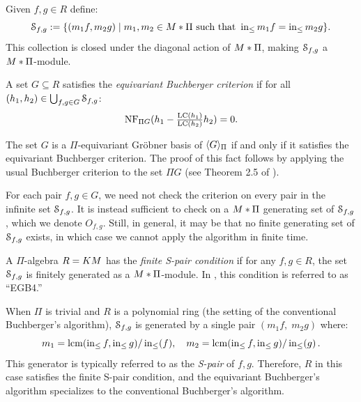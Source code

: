 Given $f,g \in R$ define:
 \[ \mathcal S_{f,g} := \{(m_1f,m_2g) \mid m_1,m_2 \in M * \Pi \text{ such that } \operatorname{in}_{\leq} m_1f = \operatorname{in}_{\leq} m_2g\}. \]
This collection is closed under the diagonal action of $M *\Pi$, making $\mathcal S_{f,g}$ a $M *\Pi$-module.  

\begin{definition}\label{def:buchberger-criterion}
A set $G \subseteq R$ satisfies the {\em equivariant Buchberger criterion} if for all $(h_1,h_2) \in \bigcup_{f,g\in G} \mathcal S_{f,g}$:
 \[ \operatorname{NF}_{\Pi G}(h_1 - \tfrac{\operatorname{LC}(h_1)}{\operatorname{LC}(h_2)}h_2) = 0. \]
\end{definition}

The set $G$ is a $\Pi$-equivariant Gr\"obner basis of $\langle G \rangle_{\Pi}$ if and only if it satisfies the equivariant Buchberger criterion.  The proof of this fact follows by applying the usual Buchberger criterion to the set $\Pi G$ (see Theorem 2.5 of \cite{Brouwer09e}).

For each pair $f,g \in G$, we need not check the criterion on every pair in the infinite set $\mathcal S_{f,g}$.  It is instead sufficient to check on a $M * \Pi$ generating set of $\mathcal S_{f,g}$, which we denote $O_{f,g}$.  Still, in general, it may be that no finite generating set of $\mathcal S_{f,g}$ exists, in which case we cannot apply the algorithm in finite time.

\begin{definition}\label{def:finite-s-pair}
 A $\Pi$-algebra $R = KM$ has the {\em finite S-pair condition} if for any $f,g \in R$, the set $\mathcal S_{f,g}$ is finitely generated as a $M * \Pi$-module.  In \cite{Brouwer09e}, this condition is referred to as ``EGB4.''
\end{definition}

When $\Pi$ is trivial and $R$ is a polynomial ring (the setting of the conventional Buchberger's algorithm), $\mathcal S_{f,g}$ is generated by a single pair $(m_1 f,\; m_2 g)$ where:
$$
m_1 = \operatorname{lcm}(\operatorname{in}_{\leq} f, \operatorname{in}_{\leq} g)/\operatorname{in}_{\leq}(f),\quad
m_2 = \operatorname{lcm}(\operatorname{in}_{\leq} f, \operatorname{in}_{\leq} g)/\operatorname{in}_{\leq}(g)
\,.
$$  
This generator is typically referred to as the {\em S-pair} of $f,g$.  Therefore, $R$ in this case satisfies the finite S-pair condition, and the equivariant Buchberger's algorithm specializes to the conventional Buchberger's algorithm.

